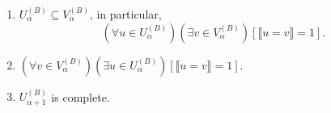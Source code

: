 \begin{enumerate}
\item $U_{\alpha}^{(B)} \subseteq V_{\alpha}^{(B)}$, in particular,
$$(\forall u \in U_{\alpha}^{(B)}) (\exists v \in V_{\alpha}^{(B)}) [\llbracket u = v \rrbracket = 1].$$
\item $(\forall v \in V_{\alpha}^{(B)}) (\exists u \in U_{\alpha}^{(B)}) [\llbracket u = v \rrbracket = 1].$
\item $U_{\alpha+1}^{(B)}$ is complete.
\end{enumerate}
